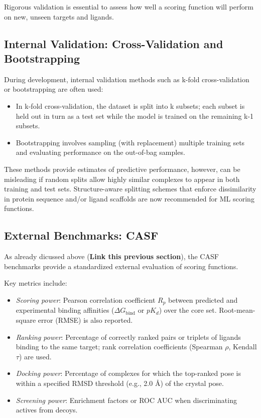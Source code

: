 \documentclass[12pt]{article}
\begin{document}
Rigorous validation is essential to assess how well a scoring function will perform on new, unseen targets and ligands.

\subsection{Internal Validation: Cross-Validation and Bootstrapping}

During development, internal validation methods such as k-fold cross-validation or bootstrapping are often used:
\begin{itemize}
    \item In k-fold cross-validation, the dataset is split into k subsets; each subset is held out in turn as a test set while the model is trained on the remaining k-1 subsets.
    \item Bootstrapping involves sampling (with replacement) multiple training sets and evaluating performance on the out-of-bag samples.
\end{itemize}

These methods provide estimates of predictive performance, however, can be misleading if random splits allow highly similar complexes to appear in both training and test sets. Structure-aware splitting schemes that enforce dissimilarity in protein sequence and/or ligand scaffolds are now recommended for ML scoring functions.\cite{CH3_li2017structural}

\subsection{External Benchmarks: CASF}

As already dicussed above (\textbf{Link this previous section}), the CASF benchmarks provide a standardized external evaluation of scoring functions.\cite{CH3_Wang2014_CASF2013_Results,CH3_Su2019_CASF2016}

Key metrics include:
\begin{itemize}
    \item \textit{Scoring power}: Pearson correlation coefficient $R_p$ between predicted and experimental binding affinities ($\Delta G_{\text{bind}}$ or $pK_d$) over the core set. Root-mean-square error (RMSE) is also reported.
    \item \textit{Ranking power}: Percentage of correctly ranked pairs or triplets of ligands binding to the same target; rank correlation coefficients (Spearman $\rho$, Kendall $\tau$) are used.
    \item \textit{Docking power}: Percentage of complexes for which the top-ranked pose is within a specified RMSD threshold (e.g., 2.0 \r{A}) of the crystal pose.
    \item \textit{Screening power}: Enrichment factors or ROC AUC when discriminating actives from decoys.
\end{itemize}
\end{document}
